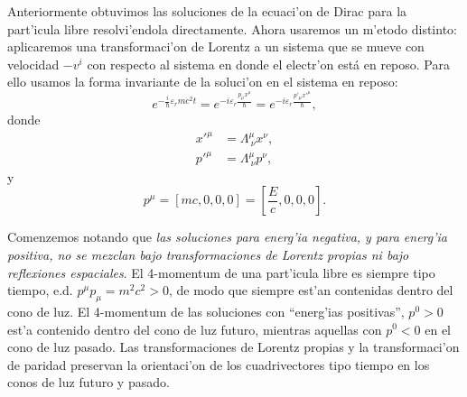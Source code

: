 Anteriormente obtuvimos las soluciones de la ecuaci'on de Dirac para la
part'icula libre resolvi'endola directamente. Ahora usaremos un m'etodo
distinto: aplicaremos una transformaci'on de Lorentz a un sistema que
se mueve con velocidad $-v^i$ con respecto al sistema en donde el electr'on
est\'{a} en reposo. Para ello usamos la forma invariante de la soluci'on en el
sistema en reposo:
\begin{equation}
e^{-\frac{i}{\hbar}\varepsilon_{r}mc^2t}=e^{-i\varepsilon_{r}%
\frac{p_\mu x^\mu}{\hbar}}=e^{-i\varepsilon_{r}\frac{p'_\mu x'^\mu}{\hbar}},
\end{equation}
donde 
\begin{align}
x'^\mu & =\Lambda^\mu_{\ \nu}x^\nu ,\\
p'^\mu & =\Lambda^\mu_{\ \nu}p^\nu,
\end{align}
y
\begin{equation}
p^\mu=\left[ mc,0,0,0\right] =\left[ \frac{E}{c},0,0,0\right].
\end{equation}

Comenzemos notando que \emph{las soluciones para energ'ia negativa, y para
energ'ia positiva, no se mezclan bajo transformaciones de Lorentz propias ni
bajo reflexiones espaciales}. El 4-momentum de una part'icula libre es siempre
tipo tiempo, e.d. $p^\mu p_\mu=m^2c^2>0$, de modo que siempre est'an contenidas
dentro del cono de luz. El 4-momentum de las soluciones con ``energ'ias
positivas'', $p^0>0$ est'a contenido dentro del cono de luz futuro, mientras
aquellas con $p^0<0$ en el cono de luz pasado. Las transformaciones de Lorentz
propias y la transformaci'on de paridad preservan la orientaci'on de los
cuadrivectores tipo tiempo en los conos de luz futuro y pasado.

